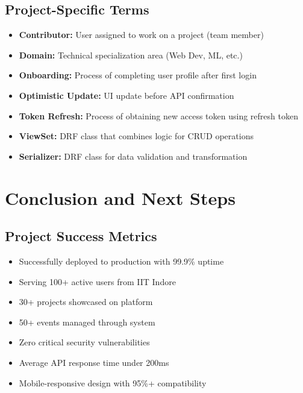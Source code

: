 \documentclass[11pt,a4paper]{article}
\begin{document}
\subsection{Project-Specific Terms}
\begin{itemize}[leftmargin=*]
    \item \textbf{Contributor:} User assigned to work on a project (team member)
    \item \textbf{Domain:} Technical specialization area (Web Dev, ML, etc.)
    \item \textbf{Onboarding:} Process of completing user profile after first login
    \item \textbf{Optimistic Update:} UI update before API confirmation
    \item \textbf{Token Refresh:} Process of obtaining new access token using refresh token
    \item \textbf{ViewSet:} DRF class that combines logic for CRUD operations
    \item \textbf{Serializer:} DRF class for data validation and transformation
\end{itemize}

\section{Conclusion and Next Steps}

\subsection{Project Success Metrics}
\begin{itemize}[leftmargin=*]
    \item Successfully deployed to production with 99.9\% uptime
    \item Serving 100+ active users from IIT Indore
    \item 30+ projects showcased on platform
    \item 50+ events managed through system
    \item Zero critical security vulnerabilities
    \item Average API response time under 200ms
    \item Mobile-responsive design with 95\%+ compatibility
\end{itemize}
\end{document}
